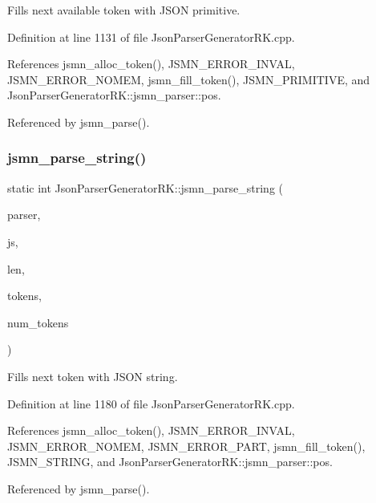 Fills next available token with J\+S\+ON primitive. 

Definition at line 1131 of file Json\+Parser\+Generator\+R\+K.\+cpp.



References jsmn\+\_\+alloc\+\_\+token(), J\+S\+M\+N\+\_\+\+E\+R\+R\+O\+R\+\_\+\+I\+N\+V\+AL, J\+S\+M\+N\+\_\+\+E\+R\+R\+O\+R\+\_\+\+N\+O\+M\+EM, jsmn\+\_\+fill\+\_\+token(), J\+S\+M\+N\+\_\+\+P\+R\+I\+M\+I\+T\+I\+VE, and Json\+Parser\+Generator\+R\+K\+::jsmn\+\_\+parser\+::pos.



Referenced by jsmn\+\_\+parse().

\mbox{\label{namespace_json_parser_generator_r_k_a474570d80c95ff3722ae1e8e989c5999}} 
\subsubsection{\texorpdfstring{jsmn\+\_\+parse\+\_\+string()}{jsmn\_parse\_string()}}
{\footnotesize\ttfamily static int Json\+Parser\+Generator\+R\+K\+::jsmn\+\_\+parse\+\_\+string (\begin{DoxyParamCaption}\item[{\hyperlink{struct_json_parser_generator_r_k_1_1jsmn__parser}{jsmn\+\_\+parser} $\ast$}]{parser,  }\item[{const char $\ast$}]{js,  }\item[{size\+\_\+t}]{len,  }\item[{\hyperlink{struct_json_parser_generator_r_k_1_1jsmntok__t}{jsmntok\+\_\+t} $\ast$}]{tokens,  }\item[{size\+\_\+t}]{num\+\_\+tokens }\end{DoxyParamCaption})\hspace{0.3cm}{\ttfamily [static]}}

Fills next token with J\+S\+ON string. 

Definition at line 1180 of file Json\+Parser\+Generator\+R\+K.\+cpp.



References jsmn\+\_\+alloc\+\_\+token(), J\+S\+M\+N\+\_\+\+E\+R\+R\+O\+R\+\_\+\+I\+N\+V\+AL, J\+S\+M\+N\+\_\+\+E\+R\+R\+O\+R\+\_\+\+N\+O\+M\+EM, J\+S\+M\+N\+\_\+\+E\+R\+R\+O\+R\+\_\+\+P\+A\+RT, jsmn\+\_\+fill\+\_\+token(), J\+S\+M\+N\+\_\+\+S\+T\+R\+I\+NG, and Json\+Parser\+Generator\+R\+K\+::jsmn\+\_\+parser\+::pos.



Referenced by jsmn\+\_\+parse().

